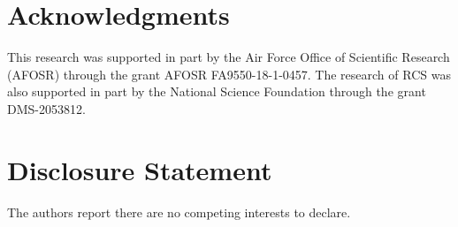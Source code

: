 \documentclass[sn-mathphys-ay]{sn-jnl}
\begin{document}
\pagebreak
\section*{Acknowledgments}

\noindent This research was supported in part by the Air Force Office of Scientific Research (AFOSR) through the grant AFOSR FA9550-18-1-0457.  The research of RCS was also supported in part by the National Science Foundation through the grant DMS-2053812.

\section*{Disclosure Statement}
\noindent The authors report there are no competing interests to declare.


\end{document}
